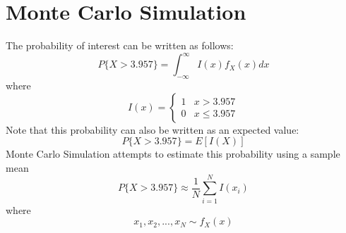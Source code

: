 \documentclass[conference]{IEEEtran}
\begin{document}
\section{Monte Carlo Simulation}
The probability of interest can be written as follows:
\begin{equation}
P\{X > 3.957\} = \int_{-\infty}^{\infty}I(x)f_X(x)dx
\end{equation}
where
\begin{equation}
I(x) = \begin{cases}
1 & x > 3.957 \\
0 & x \leq 3.957
\end{cases}
\end{equation}
Note that this probability can also be written as an expected value:
\begin{equation}
P\{X > 3.957\} = E[I(X)]
\end{equation}
Monte Carlo Simulation attempts to estimate this probability using a sample mean
\begin{equation}
P\{X > 3.957\} \approx \frac{1}{N}\sum_{i=1}^{N}I(x_i)
\end{equation}
where
\begin{equation}
x_1, x_2, ..., x_N \sim f_X(x)
\end{equation}
\end{document}
